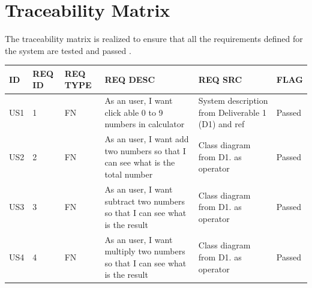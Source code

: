 \documentclass{article}
\begin{document}
\section{Traceability Matrix}

The traceability matrix is realized to ensure that all the requirements defined for the system are tested and passed \cite{prev_project}.\newline

\begin{tabular}{ |p{1cm}|p{1cm}|p{1cm}|p{3cm}|p{3cm}|p{2cm}| }
\hline
 ID & REQ ID & REQ TYPE & REQ DESC & REQ SRC  & FLAG \\
 \hline
  US1 & 1 & FN & As an user, I want click able 0 to
9 numbers in calculator & System description from Deliverable 1 (D1) and ref \cite{js_story} & Passed \\
 \hline
 US2 & 2 & FN & As an user, I want add two numbers so that I can see what is the
total number & Class diagram from D1. as operator & Passed \\
 \hline
 US3 & 3 & FN & As an user, I want subtract two
numbers so that I can see what
is the result & Class diagram from D1. as operator  & Passed \\
 \hline
 US4 & 4 & FN & As an user, I want multiply two
numbers so that I can see what
is the result & Class diagram from D1. as operator  & Passed \\
 \hline
\end{tabular}
\end{document}
